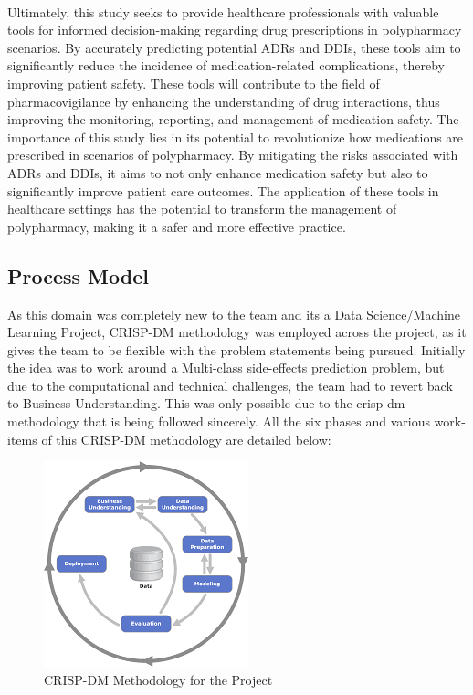 \documentclass[journal,transmag]{J-NaNA}
\begin{document}
\\
Ultimately, this study seeks to provide healthcare professionals with valuable tools for informed decision-making regarding drug prescriptions in polypharmacy scenarios. By accurately predicting potential ADRs and DDIs, these tools aim to significantly reduce the incidence of medication-related complications, thereby improving patient safety.  These tools will contribute to the field of pharmacovigilance by enhancing the understanding of drug interactions, thus improving the monitoring, reporting, and management of medication safety. The importance of this study lies in its potential to revolutionize how medications are prescribed in scenarios of polypharmacy. By mitigating the risks associated with ADRs and DDIs, it aims to not only enhance medication safety but also to significantly improve patient care outcomes. The application of these tools in healthcare settings has the potential to transform the management of polypharmacy, making it a safer and more effective practice.

\subsection{Process Model}
As this domain was completely new to the team and its a Data Science/Machine Learning Project, CRISP-DM methodology was employed across the project, as it gives the team to be flexible with the problem statements being pursued. Initially the idea was to work around a Multi-class side-effects prediction problem, but due to the computational and technical challenges, the team had to revert back to Business Understanding. This was only possible due to the crisp-dm methodology that is being followed sincerely. All the six phases and various work-items of this CRISP-DM methodology are detailed below:

\begin{figure}[htbp]
\centering
\includegraphics[width=5 cm]{crisp-dm.png} 
\caption{CRISP-DM Methodology for the Project}
\label{fig:crisp-dm methodology} %
\end{figure}
\end{document}
